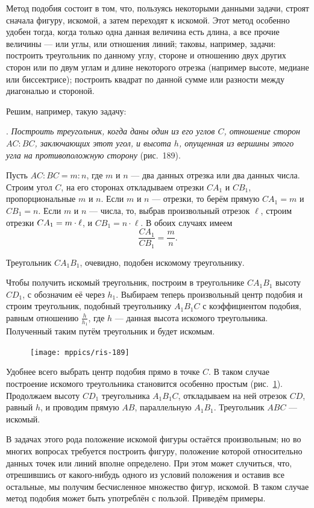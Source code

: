 \documentclass[oneside]{book}
\begin{document}
Метод подобия состоит в том, что, пользуясь некоторыми данными задачи, строят сначала фигуру,  искомой, а затем переходят к искомой.
Этот метод особенно удобен тогда, когда только одна данная величина есть длина, а все прочие величины — или углы, или отношения линий;
таковы, например, задачи:
построить треугольник по данному углу, стороне и отношению двух других сторон или по двум углам и длине некоторого отрезка (например высоте, медиане или биссектрисе);
построить квадрат по данной сумме или разности между диагональю и стороной.

Решим, например, такую задачу:

\smallskip
{}.
\emph{Построить треугольник, когда даны один из его углов $C$, отношение сторон $AC:BC$, заключающих этот угол, и высота $h$, опущенная из вершины этого угла на противоположную сторону} (рис.~189).

Пусть $AC:BC=m:n$, где $m$ и $n$ — два данных отрезка или два данных числа.
Строим угол $C$, на его сторонах откладываем отрезки $CA_1$ и $CB_1$, пропорциональные $m$ и $n$.
Если $m$ и $n$ — отрезки, то берём прямую $CA_1=m$ и $CB_1=n$.
Если $m$ и $n$ — числа, то, выбрав произвольный отрезок $\ell$, строим отрезки $CA_1\z=m \cdot \ell$, и $CB_1=n\cdot \ell$.
В обоих случаях имеем
\[\frac{CA_1}{CB_1} = \frac mn.\]

Треугольник $CA_1B_1$, очевидно, подобен искомому треугольнику.

Чтобы получить искомый треугольник, построим в треугольнике $CA_1B_1$ высоту $CD_1$, с обозначим её через $h_1$.
Выбираем теперь произвольный центр подобия и строим треугольник, подобный треугольнику $A_1B_1C$ с коэффициентом подобия, равным отношению $\tfrac{h}{h_1}$,
где $h$ — данная высота искомого треугольника.
Полученный таким путём треугольник и будет искомым.

\begin{figure}
\centering
\texttt{[image: mppics/ris-189]}
\caption{}\label{1938/ris-189}
\end{figure}

Удобнее всего выбрать центр подобия прямо в точке $C$.
В таком случае построение искомого треугольника становится особенно простым (рис.~\ref{1938/ris-189}).
Продолжаем высоту $CD_1$ треугольника $A_1B_1C$, откладываем на ней отрезок $CD$, равный $h$, и проводим прямую $AB$, параллельную $A_1B_1$.
Треугольник $ABC$ — искомый. 

\medskip

{\sloppy

В задачах этого рода положение искомой фигуры остаётся произвольным;
но во многих вопросах требуется построить фигуру, положение которой относительно данных точек или линий вполне определено.
При этом может случиться, что, отрешившись от какого-нибудь одного из условий положения и оставив все остальные, мы получим бесчисленное множество фигур,  искомой.
В таком случае метод подобия может быть употреблён с пользой.
Приведём примеры.

}
\end{document}
